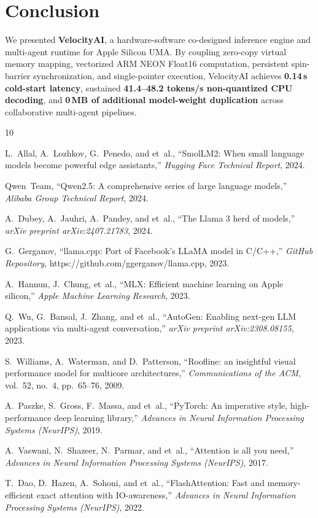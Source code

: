 \documentclass[10pt,twocolumn]{article}
\begin{document}
\section{Conclusion}
We presented \textbf{VelocityAI}, a hardware-software co-designed inference engine and multi-agent runtime for Apple Silicon UMA. By coupling zero-copy virtual memory mapping, vectorized ARM NEON Float16 computation, persistent spin-barrier synchronization, and single-pointer execution, VelocityAI achieves \textbf{0.14\,s cold-start latency}, sustained \textbf{41.4--48.2 tokens/s non-quantized CPU decoding}, and \textbf{0\,MB of additional model-weight duplication} across collaborative multi-agent pipelines.

\begin{thebibliography}{10}
\fontsize{7.5pt}{8.8pt}\selectfont
\setlength{\itemsep}{0pt}
\setlength{\parsep}{0pt}
\setlength{\parskip}{0pt}

L.~Allal, A.~Lozhkov, G.~Penedo, and et~al., ``SmolLM2: When small language models become powerful edge assistants,'' \emph{Hugging Face Technical Report}, 2024.

Qwen~Team, ``Qwen2.5: A comprehensive series of large language models,'' \emph{Alibaba Group Technical Report}, 2024.

A.~Dubey, A.~Jauhri, A.~Pandey, and et~al., ``The Llama 3 herd of models,'' \emph{arXiv preprint arXiv:2407.21783}, 2024.

G.~Gerganov, ``llama.cpp: Port of Facebook's LLaMA model in C/C++,'' \emph{GitHub Repository}, https://github.com/ggerganov/llama.cpp, 2023.

A.~Hannun, J.~Chung, et~al., ``MLX: Efficient machine learning on Apple silicon,'' \emph{Apple Machine Learning Research}, 2023.

Q.~Wu, G.~Bansal, J.~Zhang, and et~al., ``AutoGen: Enabling next-gen LLM applications via multi-agent conversation,'' \emph{arXiv preprint arXiv:2308.08155}, 2023.

S.~Williams, A.~Waterman, and D.~Patterson, ``Roofline: an insightful visual performance model for multicore architectures,'' \emph{Communications of the ACM}, vol.~52, no.~4, pp.~65--76, 2009.

A.~Paszke, S.~Gross, F.~Massa, and et~al., ``PyTorch: An imperative style, high-performance deep learning library,'' \emph{Advances in Neural Information Processing Systems (NeurIPS)}, 2019.

A.~Vaswani, N.~Shazeer, N.~Parmar, and et~al., ``Attention is all you need,'' \emph{Advances in Neural Information Processing Systems (NeurIPS)}, 2017.

T.~Dao, D.~Hazen, A.~Sohoni, and et~al., ``FlashAttention: Fast and memory-efficient exact attention with IO-awareness,'' \emph{Advances in Neural Information Processing Systems (NeurIPS)}, 2022.

\end{thebibliography}
\end{document}
